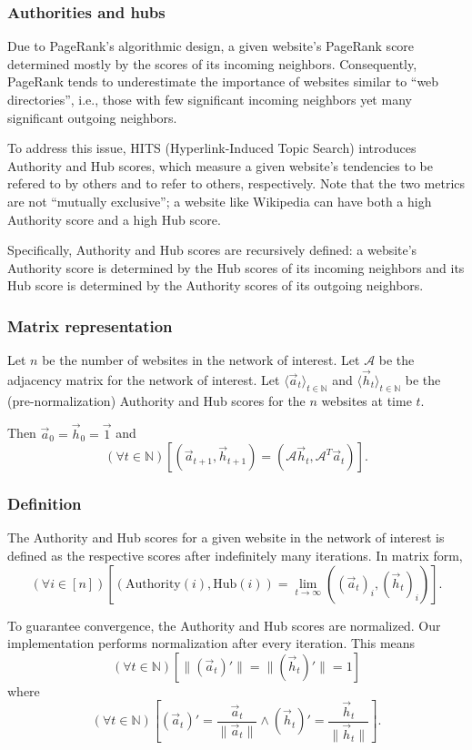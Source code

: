 \documentclass[12pt, titlepage, twoside]{amsart}
\newcommand{\N}{\ensuremath{\mathbb N}}
\begin{document}
\subsubsection{Authorities and hubs}

Due to PageRank's algorithmic design, a given website's PageRank score determined mostly by the scores of its
incoming neighbors.
Consequently, PageRank tends to underestimate the importance of websites similar to ``web directories'', i.e., those
with few significant incoming neighbors yet many significant outgoing neighbors.

To address this issue, HITS (Hyperlink-Induced Topic Search) introduces Authority and Hub scores, which measure
a given website's tendencies to be refered to by others and to refer to others, respectively.
Note that the two metrics are not ``mutually exclusive''; a website like Wikipedia can have both a high Authority score
and a high Hub score.

Specifically, Authority and Hub scores are recursively defined: a website's Authority score is determined by
the Hub scores of its incoming neighbors and its Hub score is determined by the Authority scores of its outgoing
neighbors.

\subsubsection{Matrix representation}

Let $n$ be the number of websites in the network of interest.
Let $\mathcal{A}$ be the adjacency matrix for the network of interest.
Let $\langle\vec{a}_t\rangle_{t\in\N}$ and $\langle\vec{h}_t\rangle_{t\in\N}$ be the (pre-normalization)
Authority and Hub scores for the $n$ websites at time $t$.

Then $\vec{a}_0 = \vec{h}_0 = \vec{1}$ and
\[
  (\forall t\in\N)
  \left[
    \left(\vec{a}_{t + 1}, \vec{h}_{t + 1}\right) = \left(\mathcal{A}\vec{h}_t, \mathcal{A}^T\vec{a}_t\right)
  \right].
\]

\subsubsection{Definition} The Authority and Hub scores for a given website in the network of interest is defined
as the respective scores after indefinitely many iterations.
In matrix form,
\[
  (\forall i\in[n])
  \left[
    \left(\mathrm{Authority}(i), \mathrm{Hub}(i)\right) =
    \lim_{t\to\infty}
    \left((\vec{a}_t)_i, (\vec{h}_t)_i\right)
  \right].
\]

To guarantee convergence, the Authority and Hub scores are normalized.
Our implementation performs normalization after every iteration.
This means
\[
  (\forall t\in\N)
  \left[
    \lVert(\vec{a}_t)'\rVert = \lVert(\vec{h}_t)'\rVert = 1
  \right]
\]
where
\[
  (\forall t\in\N)
  \left[
    (\vec{a}_t)' = \frac{\vec{a}_t}{\lVert\vec{a}_t\rVert}
    \wedge
    (\vec{h}_t)' = \frac{\vec{h}_t}{\lVert\vec{h}_t\rVert}
  \right].
\]
\end{document}
